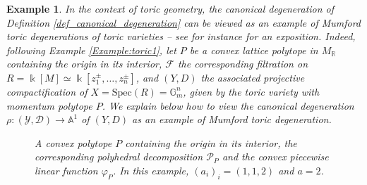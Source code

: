 \documentclass[12pt,letterpaper, reqno]{amsart}
\theoremstyle{defstyle} \newtheorem{definition}[theorem]{Definition}
\newtheorem{example}[theorem]{Example}
\theoremstyle{remark}
\numberwithin{equation}{section}
\numberwithin{figure}{section}
\newcommand{\cF} {\mathcal{F}}
\newcommand{\Spec} {\mathrm{Spec}}
\newcommand{\kk} {\Bbbk}
\newcommand{\A} {\mathbb{A}}
\newcommand{\G} {\mathbb{G}}
\newcommand{\RR} {\mathbb{R}}
\newcommand{\sP} {\mathscr{P}}
\newcommand{\cY} {\mathcal{Y}}
\newcommand{\cD} {\mathcal{D}}
\begin{document}
\begin{example}
\label{Example:toric2}
In the context of toric geometry, the canonical degeneration of Definition \ref{def_canonical_degeneration} can be viewed as an example of Mumford toric degenerations of toric varieties \cite{Mumford} -- see for instance \cite[Example 3.6]{gross} for an exposition.
Indeed, following Example \ref{Example:toric1}, let $P$ be a convex lattice polytope in $M_\RR$ containing the origin in its interior, $\cF$ the corresponding filtration on $R=\kk[M]\simeq \kk[z_1^\pm, \dots, z_n^\pm]$, and $(Y,D)$ the associated projective compactification of $X=\Spec(R)=\G_m^n$, given by the toric variety with momentum polytope $P$. 
We explain below how to view the canonical degeneration $\rho: (\cY, \cD) \rightarrow \A^1$ of $(Y,D)$
as an example of Mumford toric degeneration.



\begin{figure}[htbp]
\centering
{}
\centering
\caption{A convex polytope $P$ containing the origin in its interior, the corresponding polyhedral decomposition $\sP_P$ and the convex piecewise linear function $\varphi_P$. In this example, $(a_i)_i=(1,1,2)$ and $a=2$.}
\label{figure1}
\end{figure}


\end{example}
\end{document}
